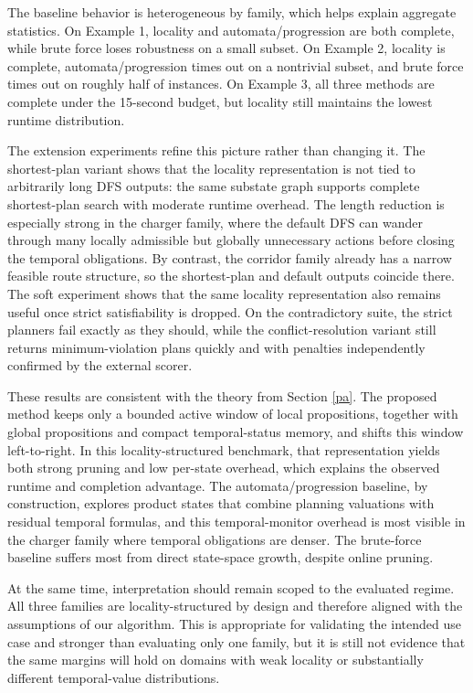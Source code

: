 \documentclass[a4paper,fleqn]{cas-dc}
\begin{document}
The baseline behavior is heterogeneous by family, which helps explain aggregate statistics. On Example 1, locality and automata/progression are both complete, while brute force loses robustness on a small subset. On Example 2, locality is complete, automata/progression times out on a nontrivial subset, and brute force times out on roughly half of instances. On Example 3, all three methods are complete under the 15-second budget, but locality still maintains the lowest runtime distribution.

The extension experiments refine this picture rather than changing it. The shortest-plan variant shows that the locality representation is not tied to arbitrarily long DFS outputs: the same substate graph supports complete shortest-plan search with moderate runtime overhead. The length reduction is especially strong in the charger family, where the default DFS can wander through many locally admissible but globally unnecessary actions before closing the temporal obligations. By contrast, the corridor family already has a narrow feasible route structure, so the shortest-plan and default outputs coincide there. The soft experiment shows that the same locality representation also remains useful once strict satisfiability is dropped. On the contradictory suite, the strict planners fail exactly as they should, while the conflict-resolution variant still returns minimum-violation plans quickly and with penalties independently confirmed by the external scorer.

These results are consistent with the theory from Section \ref{pa}. The proposed method keeps only a bounded active window of local propositions, together with global propositions and compact temporal-status memory, and shifts this window left-to-right. In this locality-structured benchmark, that representation yields both strong pruning and low per-state overhead, which explains the observed runtime and completion advantage. The automata/progression baseline, by construction, explores product states that combine planning valuations with residual temporal formulas, and this temporal-monitor overhead is most visible in the charger family where temporal obligations are denser. The brute-force baseline suffers most from direct state-space growth, despite online pruning.

At the same time, interpretation should remain scoped to the evaluated regime. All three families are locality-structured by design and therefore aligned with the assumptions of our algorithm. This is appropriate for validating the intended use case and stronger than evaluating only one family, but it is still not evidence that the same margins will hold on domains with weak locality or substantially different temporal-value distributions. %
\end{document}
